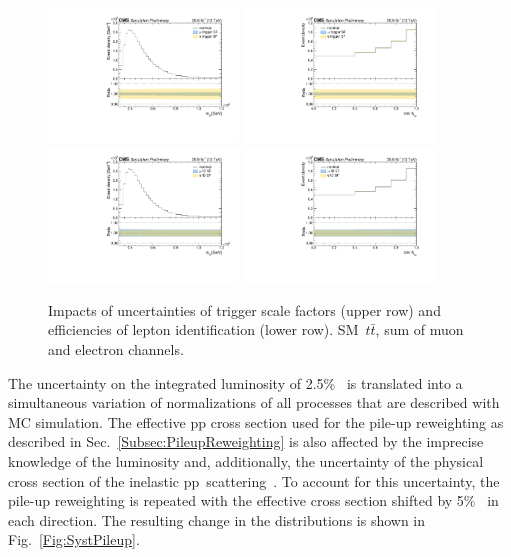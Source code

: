 \begin{figure}
  \centering
  \includegraphics[width=0.45\textwidth]{fig/chapt7/syst/impacts/MassTT/trigger.pdf}
  \includegraphics[width=0.45\textwidth]{fig/chapt7/syst/impacts/CosTopLepTT/trigger.pdf} \\
  \includegraphics[width=0.45\textwidth]{fig/chapt7/syst/impacts/MassTT/lepton.pdf}
  \includegraphics[width=0.45\textwidth]{fig/chapt7/syst/impacts/CosTopLepTT/lepton.pdf}
  \caption{Impacts of uncertainties of trigger scale factors (upper row) and efficiencies of lepton identification (lower row). SM~$t\bar t$, sum of muon and electron channels.}
  \label{Fig:SystLepton}
\end{figure}

The uncertainty on the integrated luminosity of 2.5\%~\cite{CMS-PAS-LUM-17-001} is translated into a simultaneous variation of normalizations of all processes that are described with MC simulation.
The effective pp cross section used for the pile-up reweighting as described in Sec.~\ref{Subsec:PileupReweighting} is also affected by the imprecise knowledge of the luminosity and, additionally, the uncertainty of the physical cross section of the inelastic pp~scattering~\cite{Wiki:PileupErrors}.
To account for this uncertainty, the pile-up reweighting is repeated with the effective cross section shifted by 5\%~\cite{HN:PileupCrossSection} in each direction.
The resulting change in the distributions is shown in Fig.~\ref{Fig:SystPileup}.

